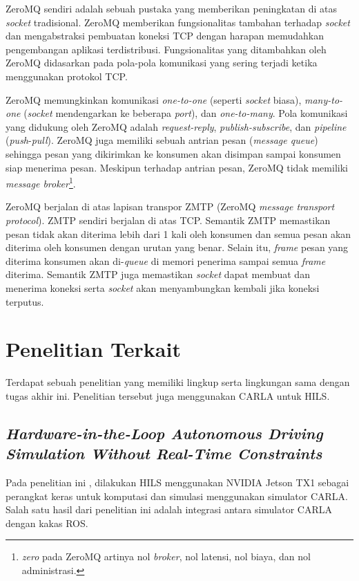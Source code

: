 ZeroMQ sendiri adalah sebuah pustaka yang memberikan pe\-ning\-ka\-tan di atas
\textit{socket} tradisional. ZeroMQ memberikan fungsionalitas tambahan terhadap
\textit{socket} dan mengabstraksi pembuatan koneksi TCP dengan harapan
memudahkan pengembangan aplikasi terdistribusi. Fungsionalitas yang ditambahkan
oleh ZeroMQ didasarkan pada pola-pola komunikasi yang sering terjadi ketika
menggunakan protokol TCP.

ZeroMQ memungkinkan komunikasi \textit{one-to-one} (seperti \textit{socket}
biasa), \textit{many-to-one} (\textit{socket} mendengarkan ke beberapa
\textit{port}), dan \textit{one-to-many}. Pola komunikasi yang didukung oleh
ZeroMQ adalah \textit{request-reply}, \textit{publish-subscribe}, dan
\textit{pipeline} (\textit{push}-\textit{pull}). ZeroMQ juga memiliki sebuah
antrian pesan (\textit{message queue}) sehingga pesan yang dikirimkan ke
konsumen akan disimpan sampai konsumen siap menerima pesan. Meskipun terhadap
antrian pesan, ZeroMQ tidak memiliki \textit{message
broker}\footnote{\textit{zero} pada ZeroMQ artinya nol \textit{broker}, nol
latensi, nol biaya, dan nol administrasi.}.

ZeroMQ berjalan di atas lapisan transpor ZMTP (ZeroMQ \textit{message transport
    protocol}). ZMTP sendiri berjalan di atas TCP. Semantik ZMTP memastikan
pesan tidak akan diterima lebih dari 1 kali oleh konsumen dan semua pesan
akan diterima oleh konsumen dengan urutan yang benar. Selain itu,
\textit{frame} pesan yang diterima konsumen akan di-\textit{queue} di memori
penerima sampai semua \textit{frame} diterima. Semantik ZMTP juga memastikan
\textit{socket} dapat membuat dan menerima koneksi serta \textit{socket}
akan menyambungkan kembali jika koneksi terputus.

\section{Penelitian Terkait}

Terdapat sebuah penelitian yang memiliki lingkup serta lingkungan sama dengan
tugas akhir ini. Penelitian tersebut juga menggunakan CARLA untuk HILS.

\subsection{\textit{Hardware-in-the-Loop Autonomous Driving Simulation Without
        Real-Time Constraints}}

Pada penelitian ini \parencite{brogle_CarlaHILS}, dilakukan HILS menggunakan
NVIDIA Jetson TX1 sebagai perangkat keras untuk komputasi dan simulasi
menggunakan simulator CARLA. Salah satu hasil dari penelitian ini adalah
integrasi antara simulator CARLA dengan kakas ROS.

